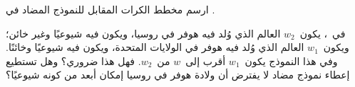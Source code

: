 \documentclass[../../../include/open-logic-section]{subfiles}
\begin{document}
\begin{prob}
ارسم مخطط الكرات المقابل للنموذج المضاد في
.
\end{prob}

\begin{prob}
  في~، يكون~$w_2$ العالم الذي
  وُلد فيه هوفر في روسيا، ويكون فيه شيوعيًا وغير خائن؛ ويكون~$w_1$
  العالم الذي وُلد فيه هوفر في الولايات المتحدة، ويكون فيه شيوعيًا
  وخائنًا. وفي هذا النموذج يكون~$w_1$ أقرب إلى~$w$ من~$w_2$.
  فهل هذا ضروري؟ وهل تستطيع إعطاء نموذج مضاد لا يفترض أن ولادة هوفر
  في روسيا إمكان أبعد من كونه شيوعيًا؟
\end{prob}
\end{document}
